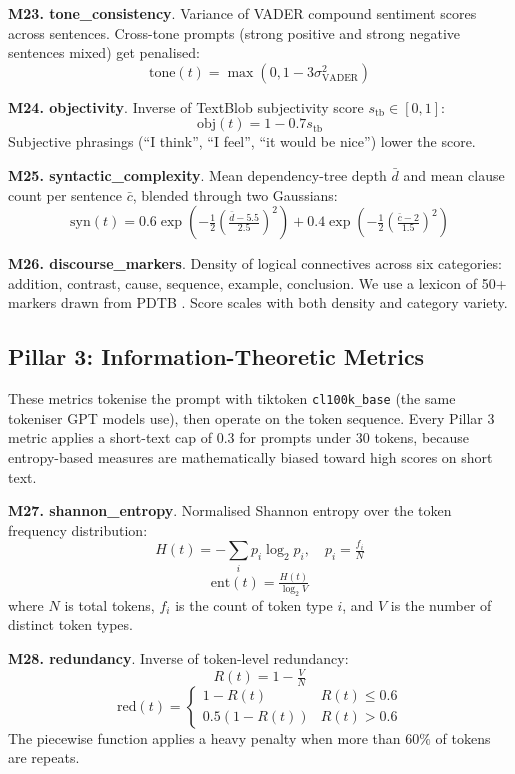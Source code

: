 \documentclass[conference]{IEEEtran}
\begin{document}
\textbf{M23. tone\_consistency}. Variance of VADER compound sentiment scores \cite{vader} across sentences. Cross-tone prompts (strong positive and strong negative sentences mixed) get penalised:
\[ \mathrm{tone}(t) = \max(0, 1 - 3 \sigma^2_{\text{VADER}}) \]

\textbf{M24. objectivity}. Inverse of TextBlob subjectivity score $s_{\text{tb}} \in [0, 1]$:
\[ \mathrm{obj}(t) = 1 - 0.7 s_{\text{tb}} \]
Subjective phrasings (``I think'', ``I feel'', ``it would be nice'') lower the score.

\textbf{M25. syntactic\_complexity}. Mean dependency-tree depth $\bar{d}$ and mean clause count per sentence $\bar{c}$, blended through two Gaussians:
\[ \mathrm{syn}(t) = 0.6 \exp\!\left(-\tfrac{1}{2}\left(\tfrac{\bar{d} - 5.5}{2.5}\right)^2\right) + 0.4 \exp\!\left(-\tfrac{1}{2}\left(\tfrac{\bar{c} - 2}{1.5}\right)^2\right) \]

\textbf{M26. discourse\_markers}. Density of logical connectives across six categories: addition, contrast, cause, sequence, example, conclusion. We use a lexicon of 50+ markers drawn from PDTB \cite{pdtb}. Score scales with both density and category variety.

\subsection{Pillar 3: Information-Theoretic Metrics}

These metrics tokenise the prompt with tiktoken \texttt{cl100k\_base} (the same tokeniser GPT models use), then operate on the token sequence. Every Pillar 3 metric applies a short-text cap of $0.3$ for prompts under 30 tokens, because entropy-based measures are mathematically biased toward high scores on short text.

\textbf{M27. shannon\_entropy}. Normalised Shannon entropy over the token frequency distribution:
\[ H(t) = -\sum_i p_i \log_2 p_i,\quad p_i = \tfrac{f_i}{N} \]
\[ \mathrm{ent}(t) = \tfrac{H(t)}{\log_2 V} \]
where $N$ is total tokens, $f_i$ is the count of token type $i$, and $V$ is the number of distinct token types.

\textbf{M28. redundancy}. Inverse of token-level redundancy:
\[ R(t) = 1 - \tfrac{V}{N} \]
\[ \mathrm{red}(t) = \begin{cases} 1 - R(t) & R(t) \leq 0.6 \\ 0.5 (1 - R(t)) & R(t) > 0.6 \end{cases} \]
The piecewise function applies a heavy penalty when more than $60\%$ of tokens are repeats.
\end{document}
